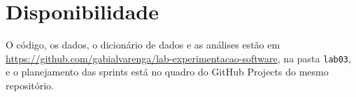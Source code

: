 \documentclass[12pt]{article}
\begin{document}
















\section*{Disponibilidade}

O código, os dados, o dicionário de dados e as análises estão em \url{https://github.com/gabialvarenga/lab-experimentacao-software}, na pasta \texttt{lab03}, e o planejamento das sprints está no quadro do GitHub Projects do mesmo repositório.



\end{document}
